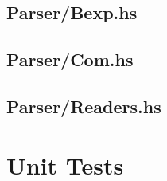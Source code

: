 \documentclass{esposito-documentation}
\begin{document}
\subsection{Parser/Bexp.hs}


\subsection{Parser/Com.hs}


\subsection{Parser/Readers.hs}


\section{Unit Tests}\label{app:unit-tests}


\backmatter
\printbibliography
\end{document}
